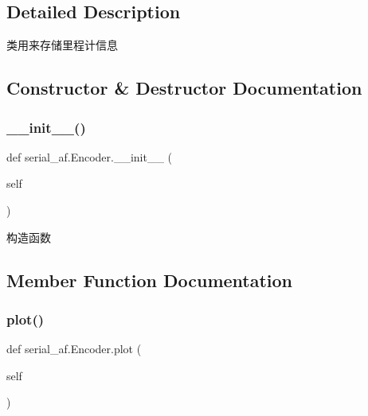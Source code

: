 \subsection{Detailed Description}
类用来存储里程计信息 



\subsection{Constructor \& Destructor Documentation}
\mbox{\label{classserial__af_1_1_encoder_ae52648d6c30aed421c3ba144646798b9}} 
\subsubsection{\texorpdfstring{\+\_\+\+\_\+init\+\_\+\+\_\+()}{\_\_init\_\_()}}
{\footnotesize\ttfamily def serial\+\_\+af.\+Encoder.\+\_\+\+\_\+init\+\_\+\+\_\+ (\begin{DoxyParamCaption}\item[{}]{self }\end{DoxyParamCaption})}



构造函数 



\subsection{Member Function Documentation}
\mbox{\label{classserial__af_1_1_encoder_a6115398fbf3ad6bd333d3bddc427e97e}} 
\subsubsection{\texorpdfstring{plot()}{plot()}}
{\footnotesize\ttfamily def serial\+\_\+af.\+Encoder.\+plot (\begin{DoxyParamCaption}\item[{}]{self }\end{DoxyParamCaption})}



